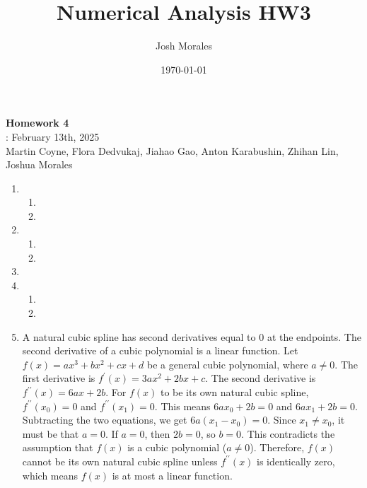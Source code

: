 \documentclass[12pt]{article}
\title{Numerical Analysis HW3}
\author{Josh Morales}
\date{\today}
\begin{document}
\pagestyle{fancy}
\begin{center}
\textbf{\Large Homework 4} \\
: February 13th, 2025\\
Martin Coyne, Flora Dedvukaj, Jiahao Gao, Anton Karabushin, Zhihan Lin, Joshua Morales
\end{center}
\begin{enumerate}[leftmargin=2em]
    \item
    \begin{enumerate}
        \item
        \item
    \end{enumerate}

    \item
    \begin{enumerate}
        \item
        \item
    \end{enumerate}

    \item

    \item
    \begin{enumerate}
        \item
        \item
    \end{enumerate}

    \item
    \begin{enumerate}
        A natural cubic spline has second derivatives equal to \(0\) at the endpoints. The second derivative of a cubic 
        polynomial is a linear function. Let \(f(x)=ax^{3}+bx^{2}+cx+d\) be a general cubic polynomial, where \(a\ne 0\). 
        The first derivative is \(f^{\prime }(x)=3ax^{2}+2bx+c\). The second derivative is \(f^{\prime \prime }
        (x)=6ax+2b\). For \(f(x)\) to be its own natural cubic spline, \(f^{\prime \prime }(x_{0})=0\) and 
        \(f^{\prime\prime }(x_{1})=0\). This means \(6ax_{0}+2b=0\) and \(6ax_{1}+2b=0\). Subtracting the two equations, we 
        get \(6a(x_{1}-x_{0})=0\). Since \(x_{1}\ne x_{0}\), it must be that \(a=0\). If \(a=0\), then \(2b=0\), so 
        \(b=0\). This contradicts the assumption that \(f(x)\) is a cubic polynomial (\(a\ne 0\)). Therefore, \(f(x)\) 
        cannot be its own natural cubic spline unless \(f^{\prime \prime }(x)\) is identically zero, which means \(f(x)\) 
        is at most a linear function.
    \end{enumerate}
    

\end{enumerate}
\end{document}
